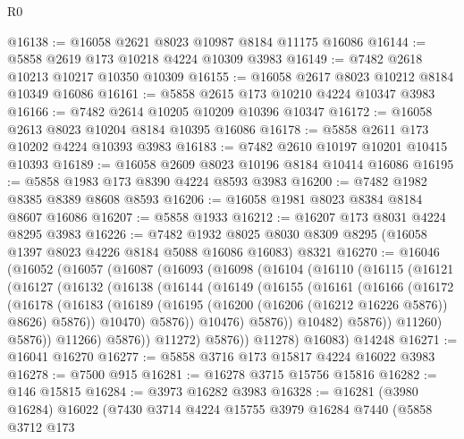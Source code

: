 \begin{lexlean}{R0}
\begin{coremodule}
@16138 := @16058 @2621 @8023 @10987 @8184 @11175 @16086
@16144 := @5858 @2619 @173 @10218 @4224 @10309 @3983
@16149 := @7482 @2618 @10213 @10217 @10350 @10309
@16155 := @16058 @2617 @8023 @10212 @8184 @10349 @16086
@16161 := @5858 @2615 @173 @10210 @4224 @10347 @3983
@16166 := @7482 @2614 @10205 @10209 @10396 @10347
@16172 := @16058 @2613 @8023 @10204 @8184 @10395 @16086
@16178 := @5858 @2611 @173 @10202 @4224 @10393 @3983
@16183 := @7482 @2610 @10197 @10201 @10415 @10393
@16189 := @16058 @2609 @8023 @10196 @8184 @10414 @16086
@16195 := @5858 @1983 @173 @8390 @4224 @8593 @3983
@16200 := @7482 @1982 @8385 @8389 @8608 @8593
@16206 := @16058 @1981 @8023 @8384 @8184 @8607 @16086
@16207 := @5858 @1933
@16212 := @16207 @173 @8031 @4224 @8295 @3983
@16226 := @7482
    @1932
    @8025
    @8030
    @8309
    @8295
    (@16058 @1397 @8023 @4226 @8184 @5088 @16086 @16083)
    @8321
@16270 := @16046
    (@16052
      (@16057
        (@16087
          (@16093
            (@16098
              (@16104
                (@16110
                  (@16115
                    (@16121
                      (@16127
                        (@16132
                          (@16138
                            (@16144
                              (@16149
                                (@16155
                                  (@16161
                                    (@16166
                                      (@16172
                                        (@16178
                                          (@16183
                                            (@16189
                                              (@16195
                                                (@16200 (@16206 (@16212 @16226 @5876)) @8626)
                                                @5876))
                                            @10470)
                                          @5876))
                                      @10476)
                                    @5876))
                                @10482)
                              @5876))
                          @11260)
                        @5876))
                    @11266)
                  @5876))
              @11272)
            @5876))
        @11278)
      @16083)
    @14248
@16271 := @16041 @16270
@16277 := @5858 @3716 @173 @15817 @4224 @16022 @3983
@16278 := @7500 @915
@16281 := @16278 @3715 @15756 @15816
@16282 := @146 @15815
@16284 := @3973 @16282 @3983
@16328 := @16281
    (@3980 @16284)
    @16022
    (@7430
      @3714
      @4224
      @15755
      @3979
      @16284
      @7440
      (@5858
        @3712
        @173

\end{coremodule}
\end{lexlean}
